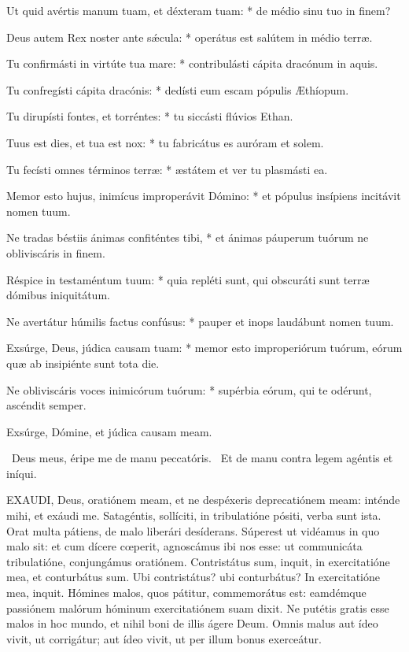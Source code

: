 Ut quid avértis manum tuam, et déxteram tuam: * de médio sinu tuo in finem?

Deus autem Rex noster ante sǽcula: * operátus est salútem in médio terræ.

Tu confirmásti in virtúte tua mare: * contribulásti cápita dracónum in aquis.

Tu confregísti cápita dracónis: * dedísti eum escam pópulis Æthíopum.

Tu dirupísti fontes, et torréntes: * tu siccásti flúvios Ethan.

Tuus est dies, et tua est nox: * tu fabricátus es auróram et solem.

Tu fecísti omnes términos terræ: * æstátem et ver tu plasmásti ea.

Memor esto hujus, inimícus improperávit Dómino: * et pópulus insípiens incitávit nomen tuum.

Ne tradas béstiis ánimas confiténtes tibi, * et ánimas páuperum tuórum ne obliviscáris in finem.

Réspice in testaméntum tuum: * quia repléti sunt, qui obscuráti sunt terræ dómibus iniquitátum.

Ne avertátur húmilis factus confúsus: * pauper et inops laudábunt nomen tuum.

Exsúrge, Deus, júdica causam tuam: * memor esto improperiórum tuórum, eórum quæ ab insipiénte sunt tota die.

Ne obliviscáris voces inimicórum tuórum: * supérbia eórum, qui te odérunt, ascéndit semper.

\rubric{\textdagger}

 Exsúrge, Dómine, et júdica causam meam.

\V\ Deus meus, éripe me de manu peccatóris. \R\ Et de manu contra legem agéntis et iníqui.





\lettrine[lines=2]{E}{XAUDI}, Deus, oratiónem meam, et ne despéxeris deprecatiónem meam: inténde mihi, et exáudi me. Satagéntis, sollíciti, in tribulatióne pósiti, verba sunt ista. Orat multa pátiens, de malo liberári desíderans. Súperest ut vidéamus in quo malo sit: et cum dícere cœperit, agnoscámus ibi nos esse: ut communicáta tribulatióne, conjungámus oratiónem. Contristátus sum, inquit, in exercitatióne mea, et conturbátus sum. Ubi contristátus? ubi conturbátus? In exercitatióne mea, inquit. Hómines malos, quos pátitur, commemorátus est: eamdémque passiónem malórum hóminum exercitatiónem suam dixit. Ne putétis gratis esse malos in hoc mundo, et nihil boni de illis ágere Deum. Omnis malus aut ídeo vivit, ut corrigátur; aut ídeo vivit, ut per illum bonus exerceátur.

